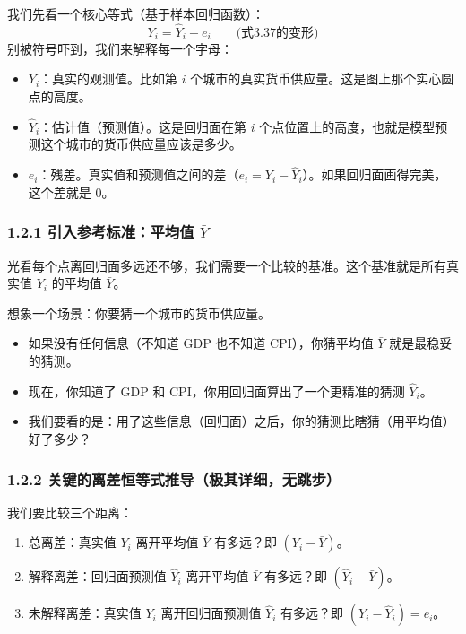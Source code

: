 \documentclass[12pt,a4paper]{ctexart}
\begin{document}
我们先看一个核心等式（基于样本回归函数）：
\[
Y_i = \hat{Y}_i + e_i \qquad \text{(式3.37的变形)}
\]
别被符号吓到，我们来解释每一个字母：
\begin{itemize}
    \item \textbf{\(Y_i\)}：真实的观测值。比如第 \(i\) 个城市的真实货币供应量。这是图上那个实心圆点的高度。
    \item \textbf{\(\hat{Y}_i\)}：估计值（预测值）。这是回归面在第 \(i\) 个点位置上的高度，也就是模型预测这个城市的货币供应量应该是多少。
    \item \textbf{\(e_i\)}：残差。真实值和预测值之间的差（\(e_i = Y_i - \hat{Y}_i\)）。如果回归面画得完美，这个差就是 0。
\end{itemize}

\subsubsection{1.2.1 引入参考标准：平均值 \(\bar{Y}\)}

光看每个点离回归面多远还不够，我们需要一个比较的基准。这个基准就是所有真实值 \(Y_i\) 的平均值 \(\bar{Y}\)。

想象一个场景：你要猜一个城市的货币供应量。
\begin{itemize}
    \item 如果没有任何信息（不知道 GDP 也不知道 CPI），你猜平均值 \(\bar{Y}\) 就是最稳妥的猜测。
    \item 现在，你知道了 GDP 和 CPI，你用回归面算出了一个更精准的猜测 \(\hat{Y}_i\)。
    \item 我们要看的是：用了这些信息（回归面）之后，你的猜测比瞎猜（用平均值）好了多少？
\end{itemize}

\subsubsection{1.2.2 关键的离差恒等式推导（极其详细，无跳步）}

我们要比较三个距离：
\begin{enumerate}
    \item 总离差：真实值 \(Y_i\) 离开平均值 \(\bar{Y}\) 有多远？即 \((Y_i - \bar{Y})\)。
    \item 解释离差：回归面预测值 \(\hat{Y}_i\) 离开平均值 \(\bar{Y}\) 有多远？即 \((\hat{Y}_i - \bar{Y})\)。
    \item 未解释离差：真实值 \(Y_i\) 离开回归面预测值 \(\hat{Y}_i\) 有多远？即 \((Y_i - \hat{Y}_i) = e_i\)。
\end{enumerate}
\end{document}
